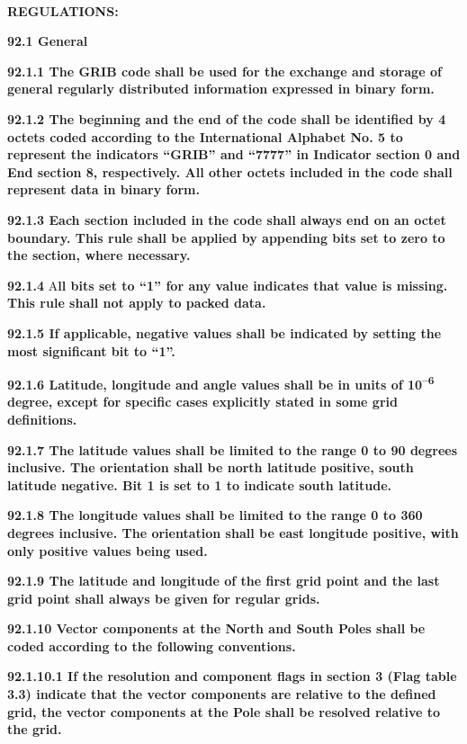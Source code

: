 \textbf{\\
}

\textbf{REGULATIONS:}

\textbf{92.1 General}

\textbf{92.1.1 The GRIB code shall be used for the exchange and storage of general regularly distributed information expressed in binary form.}

\textbf{92.1.2 The beginning and the end of the code shall be identified by 4 octets coded according to the International Alphabet No. 5 to represent the indicators ``GRIB'' and ``7777'' in Indicator section 0 and End section 8, respectively. All other octets included in the code shall represent data in binary form.}

\textbf{92.1.3 Each section included in the code shall always end on an octet boundary. This rule shall be applied by appending bits set to zero to the section, where necessary.}

\textbf{92.1.4} A\textbf{ll bits set to ``1'' for any value indicates that value is missing. This rule shall not apply to packed data.}

\textbf{92.1.5 If applicable, negative values shall be indicated by setting the most significant bit to ``1''.}

\textbf{92.1.6 Latitude, longitude and angle values shall be in units of 10\textsuperscript{--6} degree, except for specific cases explicitly stated in some grid definitions.}

\textbf{92.1.7 The latitude values shall be limited to the range 0 to 90 degrees inclusive. The orientation shall be north latitude positive, south latitude negative. Bit 1 is set to 1 to indicate south latitude.}

\textbf{92.1.8 The longitude values shall be limited to the range 0 to 360 degrees inclusive. The orientation shall be east longitude positive, with only positive values being used.}

\textbf{92.1.9 The latitude and longitude of the first grid point and the last grid point shall always be given for regular grids.}

\textbf{92.1.10 Vector components at the North and South Poles shall be coded according to the following conventions.}

\textbf{92.1.10.1 If the resolution and component flags in section 3 (Flag table 3.3) indicate that the vector components are relative to the defined grid, the vector components at the Pole shall be resolved relative to the grid.}

